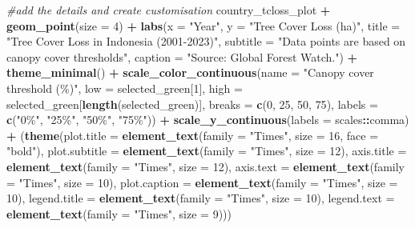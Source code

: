 \documentclass[
]{article}
\newenvironment{Shaded}{\begin{snugshade}}{\end{snugshade}}
\newcommand{\AttributeTok}[1]{\textcolor[rgb]{0.13,0.29,0.53}{#1}}
\newcommand{\CommentTok}[1]{\textcolor[rgb]{0.56,0.35,0.01}{\textit{#1}}}
\newcommand{\DecValTok}[1]{\textcolor[rgb]{0.00,0.00,0.81}{#1}}
\newcommand{\FunctionTok}[1]{\textcolor[rgb]{0.13,0.29,0.53}{\textbf{#1}}}
\newcommand{\NormalTok}[1]{#1}
\newcommand{\SpecialCharTok}[1]{\textcolor[rgb]{0.81,0.36,0.00}{\textbf{#1}}}
\newcommand{\StringTok}[1]{\textcolor[rgb]{0.31,0.60,0.02}{#1}}
\begin{document}
\begin{Shaded}
\begin{Highlighting}[]
\CommentTok{\#add the details and create customisation}
\NormalTok{country\_tcloss\_plot }\SpecialCharTok{+} 
  \FunctionTok{geom\_point}\NormalTok{(}\AttributeTok{size =} \DecValTok{4}\NormalTok{) }\SpecialCharTok{+} 
  \FunctionTok{labs}\NormalTok{(}\AttributeTok{x =} \StringTok{"Year"}\NormalTok{, }\AttributeTok{y =} \StringTok{"Tree Cover Loss (ha)"}\NormalTok{,}
       \AttributeTok{title =} \StringTok{"Tree Cover Loss in Indonesia (2001{-}2023)"}\NormalTok{,}
       \AttributeTok{subtitle =} \StringTok{"Data points are based on canopy cover thresholds"}\NormalTok{,}
       \AttributeTok{caption =} \StringTok{"Source: Global Forest Watch."}\NormalTok{) }\SpecialCharTok{+}
  \FunctionTok{theme\_minimal}\NormalTok{() }\SpecialCharTok{+}
  \FunctionTok{scale\_color\_continuous}\NormalTok{(}\AttributeTok{name =} \StringTok{"Canopy cover threshold (\%)"}\NormalTok{, }\AttributeTok{low =}\NormalTok{ selected\_green[}\DecValTok{1}\NormalTok{], }
                         \AttributeTok{high =}\NormalTok{ selected\_green[}\FunctionTok{length}\NormalTok{(selected\_green)], }
                         \AttributeTok{breaks =} \FunctionTok{c}\NormalTok{(}\DecValTok{0}\NormalTok{, }\DecValTok{25}\NormalTok{, }\DecValTok{50}\NormalTok{, }\DecValTok{75}\NormalTok{), }
                         \AttributeTok{labels =} \FunctionTok{c}\NormalTok{(}\StringTok{"0\%"}\NormalTok{, }\StringTok{"25\%"}\NormalTok{, }\StringTok{"50\%"}\NormalTok{, }\StringTok{"75\%"}\NormalTok{)) }\SpecialCharTok{+} 
  \FunctionTok{scale\_y\_continuous}\NormalTok{(}\AttributeTok{labels =}\NormalTok{ scales}\SpecialCharTok{::}\NormalTok{comma) }\SpecialCharTok{+}
\NormalTok{   (}\FunctionTok{theme}\NormalTok{(}\AttributeTok{plot.title =} \FunctionTok{element\_text}\NormalTok{(}\AttributeTok{family =} \StringTok{"Times"}\NormalTok{, }\AttributeTok{size =} \DecValTok{16}\NormalTok{, }\AttributeTok{face =} \StringTok{"bold"}\NormalTok{),}
         \AttributeTok{plot.subtitle =} \FunctionTok{element\_text}\NormalTok{(}\AttributeTok{family =} \StringTok{"Times"}\NormalTok{, }\AttributeTok{size =} \DecValTok{12}\NormalTok{),}
         \AttributeTok{axis.title =} \FunctionTok{element\_text}\NormalTok{(}\AttributeTok{family =} \StringTok{"Times"}\NormalTok{, }\AttributeTok{size =} \DecValTok{12}\NormalTok{),}
         \AttributeTok{axis.text =} \FunctionTok{element\_text}\NormalTok{(}\AttributeTok{family =} \StringTok{"Times"}\NormalTok{, }\AttributeTok{size =} \DecValTok{10}\NormalTok{), }
         \AttributeTok{plot.caption =} \FunctionTok{element\_text}\NormalTok{(}\AttributeTok{family =} \StringTok{"Times"}\NormalTok{, }\AttributeTok{size =} \DecValTok{10}\NormalTok{),}
         \AttributeTok{legend.title =} \FunctionTok{element\_text}\NormalTok{(}\AttributeTok{family =} \StringTok{"Times"}\NormalTok{, }\AttributeTok{size =} \DecValTok{10}\NormalTok{),}
         \AttributeTok{legend.text =} \FunctionTok{element\_text}\NormalTok{(}\AttributeTok{family =} \StringTok{"Times"}\NormalTok{, }\AttributeTok{size =} \DecValTok{9}\NormalTok{))) }
\end{Highlighting}
\end{Shaded}
\end{document}
